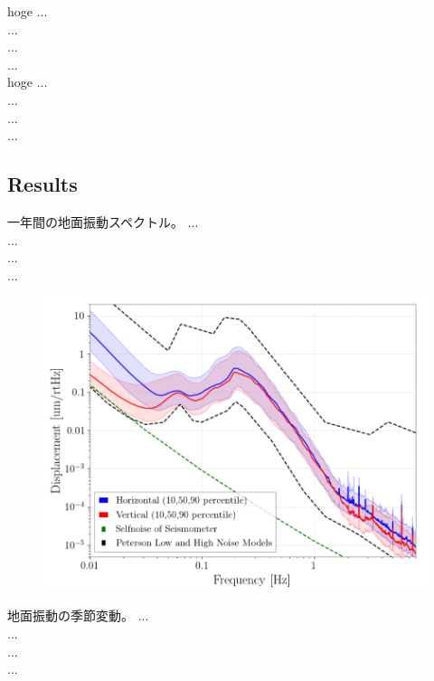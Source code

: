hoge
...\\
...\\
...\\
...\\

hoge
...\\
...\\
...\\
...\\

\subsection{Results}
一年間の地面振動スペクトル。
...\\
...\\
...\\
...\\

\begin{figure}[h]
  \begin{center}   
    \includegraphics[width=16.0cm]{./img_chap3/img313.png}
    \caption{}\label{img:img313}
  \end{center}
\end{figure}

地面振動の季節変動。
...\\
...\\
...\\
...\\

